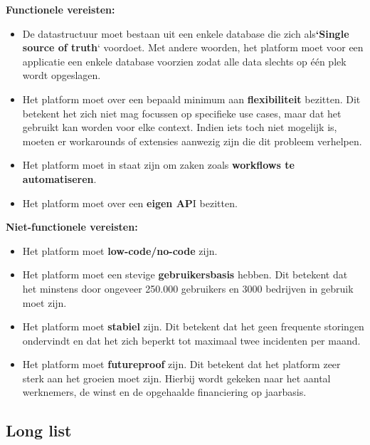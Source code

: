 \textbf{Functionele vereisten:}

\begin{itemize}
    \item De datastructuur moet bestaan uit een enkele database die zich als\textbf{`Single source of truth}` voordoet. Met andere woorden, het platform moet voor een applicatie een enkele database voorzien zodat alle data slechts op één plek wordt opgeslagen.
    \item Het platform moet over een bepaald minimum aan \textbf{flexibiliteit} bezitten. Dit betekent het zich niet mag focussen op specifieke use cases, maar dat het gebruikt kan worden voor elke context. Indien iets toch niet mogelijk is, moeten er workarounds of extensies aanwezig zijn die dit probleem verhelpen.
    \item Het platform moet in staat zijn om zaken zoals \textbf{workflows te automatiseren}.
    \item Het platform moet over een \textbf{eigen AP}I bezitten.
\end{itemize}

\textbf{Niet-functionele vereisten:} 

\begin{itemize}
    \item Het platform moet \textbf{low-code/no-code} zijn.
    \item Het platform moet een stevige \textbf{gebruikersbasis} hebben. Dit betekent dat het minstens door ongeveer 250.000 gebruikers en 3000 bedrijven in gebruik moet zijn.
    \item Het platform moet \textbf{stabiel} zijn. Dit betekent dat het geen frequente storingen ondervindt en dat het zich beperkt tot maximaal twee incidenten per maand.
    \item Het platform moet \textbf{futureproof} zijn. Dit betekent dat het platform zeer sterk aan het groeien moet zijn. Hierbij wordt gekeken naar het aantal werknemers, de winst en de opgehaalde financiering op jaarbasis.
\end{itemize}


\subsection{Long list}

